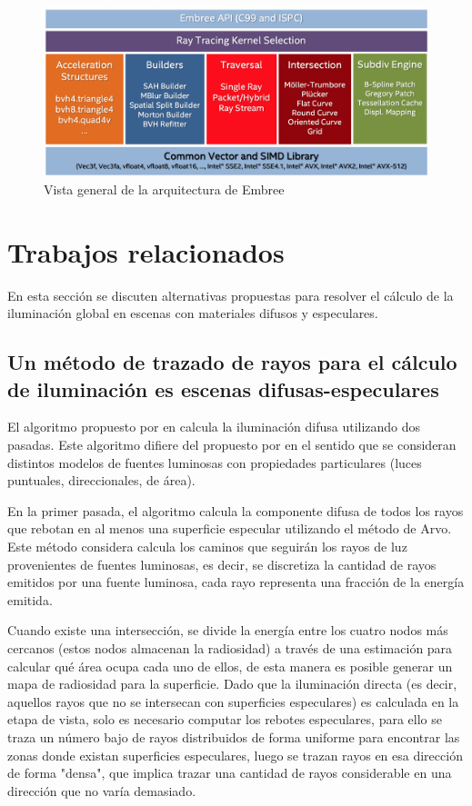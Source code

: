 \vspace{5mm}
\begin{figure}[H]
	\centering
	\includegraphics[width=.8\linewidth]{assets/embree}
	\caption{Vista general de la arquitectura de Embree}
	\label{img:embree}
\end{figure}

\section{Trabajos relacionados}

En esta sección se discuten alternativas propuestas para resolver el cálculo de la iluminación global en escenas con materiales difusos y especulares.

\subsection{Un método de trazado de rayos para el cálculo de iluminación es escenas difusas-especulares}

El algoritmo propuesto por \citeauthor{Shirley} en \citeyear{Shirley} calcula la iluminación difusa utilizando dos pasadas. Este algoritmo difiere del propuesto por \citeauthor{Sillion} en el sentido que se consideran distintos modelos de fuentes luminosas con propiedades particulares (luces puntuales, direccionales, de área).

En la primer pasada, el algoritmo calcula la componente difusa de todos los rayos que rebotan en al menos una superficie especular utilizando el método de Arvo. Este método considera calcula los caminos que seguirán los rayos de luz provenientes de fuentes luminosas, es decir, se discretiza la cantidad de rayos emitidos por una fuente luminosa, cada rayo representa una fracción de la energía emitida.

Cuando existe una intersección, se divide la energía entre los cuatro nodos más cercanos (estos nodos almacenan la radiosidad) a través de una estimación para calcular qué área ocupa cada uno de ellos, de esta manera es posible generar un mapa de radiosidad para la superficie. Dado que la iluminación directa (es decir, aquellos rayos que no se intersecan con superficies especulares) es calculada en la etapa de vista, solo es necesario computar los rebotes especulares, para ello se traza un número bajo de rayos distribuidos de forma uniforme para encontrar las zonas donde existan superficies especulares, luego se trazan rayos en esa dirección de forma "densa", que implica trazar una cantidad de rayos considerable en una dirección que no varía demasiado.

